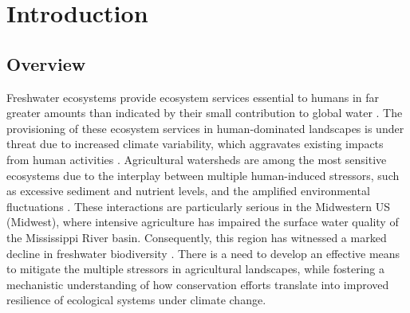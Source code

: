 \documentclass[12pt, class=article, crop=false]{standalone}
\begin{document}

\section{Introduction}

\subsection{Overview}

Freshwater ecosystems provide ecosystem services essential to humans in far greater amounts than indicated by their small contribution to global water \citep{dodds_freshwater_2017}.
The provisioning of these ecosystem services in human-dominated landscapes is under threat due to increased climate variability, which aggravates existing impacts from human activities \citep{reid_emerging_2019}.
Agricultural watersheds are among the most sensitive ecosystems due to the interplay between multiple human-induced stressors, such as excessive sediment and nutrient levels, and the amplified environmental fluctuations \citep{piggott_climate_2015, birk_impacts_2020}.
These interactions are particularly serious in the Midwestern US (Midwest), where intensive agriculture has impaired the surface water quality of the Mississippi River basin.
Consequently, this region has witnessed a marked decline in freshwater biodiversity \citep{engstrom_historical_2009, hansen_contribution_2018, kelley_source_2000, hansen_coupling_2016, terui_quantifying_2019}.
There is a need to develop an effective means to mitigate the multiple stressors in agricultural landscapes, while fostering a mechanistic understanding of how conservation efforts translate into improved resilience of ecological systems under climate change.
\end{document}
